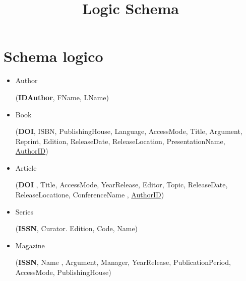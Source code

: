 \chapter{Schema logico}
\title{Logic Schema}



\maketitle
																			

\begin{itemize}


\item Author


(\textbf{IDAuthor}, FName, LName)




\item Book


(\textbf{DOI}, ISBN, PublishingHouse, Language, AccessMode, Title, Argument, Reprint, Edition, ReleaseDate, ReleaseLocation, PresentationName, \underline{AuthorID})


\item Article

(\textbf{DOI} , Title, AccessMode, YearRelease, Editor, Topic, ReleaseDate, ReleaseLocatione, ConferenceName , \underline{AuthorID})



\item Series


(\textbf{ISSN}, Curator. Edition, Code, Name)



\item Magazine


(\textbf{ISSN}, Name , Argument, Manager, YearRelease, PublicationPeriod, AccessMode,
PublishingHouse)



\end{itemize}
